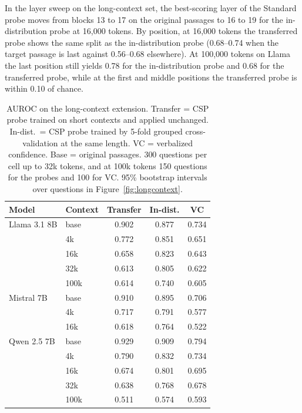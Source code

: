 \documentclass[acmsmall,screen,review]{acmart}
\begin{document}
In the layer sweep on the long-context set, the best-scoring layer of the Standard probe moves from blocks 13 to 17 on the original passages to 16 to 19 for the in-distribution probe at 16,000 tokens. By position, at 16,000 tokens the transferred probe shows the same split as the in-distribution probe (0.68--0.74 when the target passage is last against 0.56--0.68 elsewhere). At 100,000 tokens on Llama the last position still yields 0.78 for the in-distribution probe and 0.68 for the transferred probe, while at the first and middle positions the transferred probe is within 0.10 of chance.

\begin{table}[h]
\centering
\caption{AUROC on the long-context extension. Transfer = CSP probe trained on short contexts and applied unchanged. In-dist.\ = CSP probe trained by 5-fold grouped cross-validation at the same length. VC = verbalized confidence. Base = original passages. 300 questions per cell up to 32k tokens, and at 100k tokens 150 questions for the probes and 100 for VC. 95\% bootstrap intervals over questions in Figure~\ref{fig:longcontext}.}
\label{tab:longcontext}
\small
\begin{tabular}{@{}llccc@{}}
\toprule
Model & Context & Transfer & In-dist. & VC \\
\midrule
Llama 3.1 8B  & base & 0.902 & 0.877 & 0.734 \\
              & 4k   & 0.772 & 0.851 & 0.651 \\
              & 16k  & 0.658 & 0.823 & 0.643 \\
              & 32k  & 0.613 & 0.805 & 0.622 \\
              & 100k & 0.614 & 0.740 & 0.605 \\
\midrule
Mistral 7B    & base & 0.910 & 0.895 & 0.706 \\
              & 4k   & 0.717 & 0.791 & 0.577 \\
              & 16k  & 0.618 & 0.764 & 0.522 \\
\midrule
Qwen 2.5 7B   & base & 0.929 & 0.909 & 0.794 \\
              & 4k   & 0.790 & 0.832 & 0.734 \\
              & 16k  & 0.674 & 0.801 & 0.695 \\
              & 32k  & 0.638 & 0.768 & 0.678 \\
              & 100k & 0.511 & 0.574 & 0.593 \\
\bottomrule
\end{tabular}
\end{table}
\end{document}
